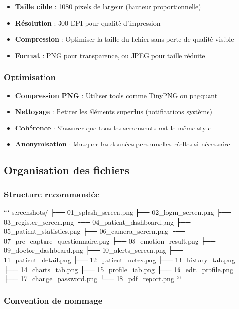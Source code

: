 \documentclass[a4paper,11pt]{report}
\begin{document}
\begin{itemize}
    \item \textbf{Taille cible} : 1080 pixels de largeur (hauteur proportionnelle)
    \item \textbf{Résolution} : 300 DPI pour qualité d'impression
    \item \textbf{Compression} : Optimiser la taille du fichier sans perte de qualité visible
    \item \textbf{Format} : PNG pour transparence, ou JPEG pour taille réduite
\end{itemize}

\subsubsection{Optimisation}

\begin{itemize}
    \item \textbf{Compression PNG} : Utiliser tools comme TinyPNG ou pngquant
    \item \textbf{Nettoyage} : Retirer les éléments superflus (notifications système)
    \item \textbf{Cohérence} : S'assurer que tous les screenshots ont le même style
    \item \textbf{Anonymisation} : Masquer les données personnelles réelles si nécessaire
\end{itemize}

\subsection{Organisation des fichiers}

\subsubsection{Structure recommandée}

```
screenshots/
├── 01_splash_screen.png
├── 02_login_screen.png
├── 03_register_screen.png
├── 04_patient_dashboard.png
├── 05_patient_statistics.png
├── 06_camera_screen.png
├── 07_pre_capture_questionnaire.png
├── 08_emotion_result.png
├── 09_doctor_dashboard.png
├── 10_alerts_screen.png
├── 11_patient_detail.png
├── 12_patient_notes.png
├── 13_history_tab.png
├── 14_charts_tab.png
├── 15_profile_tab.png
├── 16_edit_profile.png
├── 17_change_password.png
└── 18_pdf_report.png
```

\subsubsection{Convention de nommage}
\end{document}
